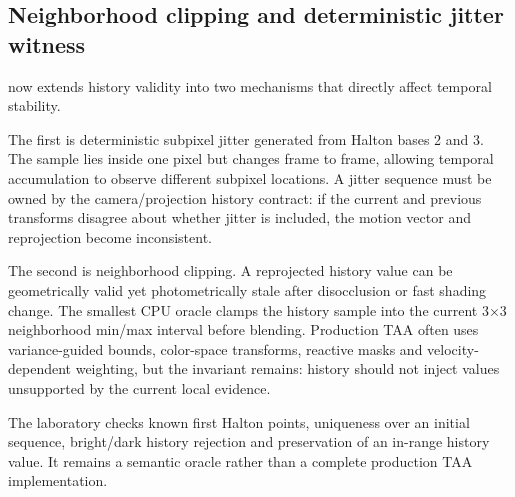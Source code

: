 \subsection{Neighborhood clipping and deterministic jitter witness}\label{appendix-0727340a4428-neighborhood-clipping-and-deterministic-jitter-witness}

\hypertarget{appendix-0727340a4428-neighborhood-clipping-and-deterministic-jitter-witness}{}

 now extends history validity into two mechanisms that directly affect temporal stability.

The first is deterministic subpixel jitter generated from Halton bases 2 and 3. The sample lies inside one pixel but changes frame to frame, allowing temporal accumulation to observe different subpixel locations. A jitter sequence must be owned by the camera/projection history contract: if the current and previous transforms disagree about whether jitter is included, the motion vector and reprojection become inconsistent.

The second is neighborhood clipping. A reprojected history value can be geometrically valid yet photometrically stale after disocclusion or fast shading change. The smallest CPU oracle clamps the history sample into the current 3×3 neighborhood min/max interval before blending. Production TAA often uses variance-guided bounds, color-space transforms, reactive masks and velocity-dependent weighting, but the invariant remains: history should not inject values unsupported by the current local evidence.

The laboratory checks known first Halton points, uniqueness over an initial sequence, bright/dark history rejection and preservation of an in-range history value. It remains a semantic oracle rather than a complete production TAA implementation.
